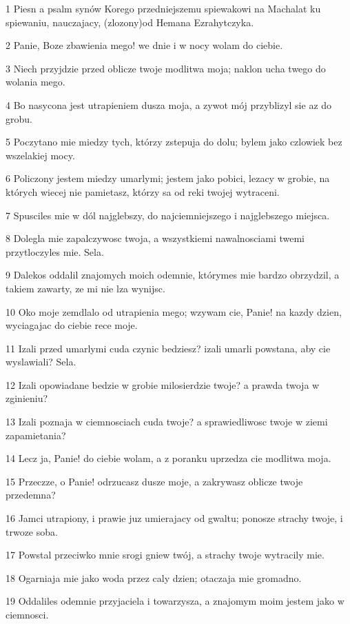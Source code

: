 \par 1 Piesn a psalm synów Korego przedniejszemu spiewakowi na Machalat ku spiewaniu, nauczajacy, (zlozony)od Hemana Ezrahytczyka.
\par 2 Panie, Boze zbawienia mego! we dnie i w nocy wolam do ciebie.
\par 3 Niech przyjdzie przed oblicze twoje modlitwa moja; naklon ucha twego do wolania mego.
\par 4 Bo nasycona jest utrapieniem dusza moja, a zywot mój przyblizyl sie az do grobu.
\par 5 Poczytano mie miedzy tych, którzy zstepuja do dolu; bylem jako czlowiek bez wszelakiej mocy.
\par 6 Policzony jestem miedzy umarlymi; jestem jako pobici, lezacy w grobie, na których wiecej nie pamietasz, którzy sa od reki twojej wytraceni.
\par 7 Spusciles mie w dól najglebszy, do najciemniejszego i najglebszego miejsca.
\par 8 Dolegla mie zapalczywosc twoja, a wszystkiemi nawalnosciami twemi przytloczyles mie. Sela.
\par 9 Dalekos oddalil znajomych moich odemnie, którymes mie bardzo obrzydzil, a takiem zawarty, ze mi nie lza wynijsc.
\par 10 Oko moje zemdlalo od utrapienia mego; wzywam cie, Panie! na kazdy dzien, wyciagajac do ciebie rece moje.
\par 11 Izali przed umarlymi cuda czynic bedziesz? izali umarli powstana, aby cie wyslawiali? Sela.
\par 12 Izali opowiadane bedzie w grobie milosierdzie twoje? a prawda twoja w zginieniu?
\par 13 Izali poznaja w ciemnosciach cuda twoje? a sprawiedliwosc twoje w ziemi zapamietania?
\par 14 Lecz ja, Panie! do ciebie wolam, a z poranku uprzedza cie modlitwa moja.
\par 15 Przeczze, o Panie! odrzucasz dusze moje, a zakrywasz oblicze twoje przedemna?
\par 16 Jamci utrapiony, i prawie juz umierajacy od gwaltu; ponosze strachy twoje, i trwoze soba.
\par 17 Powstal przeciwko mnie srogi gniew twój, a strachy twoje wytracily mie.
\par 18 Ogarniaja mie jako woda przez caly dzien; otaczaja mie gromadno.
\par 19 Oddaliles odemnie przyjaciela i towarzysza, a znajomym moim jestem jako w ciemnosci.

